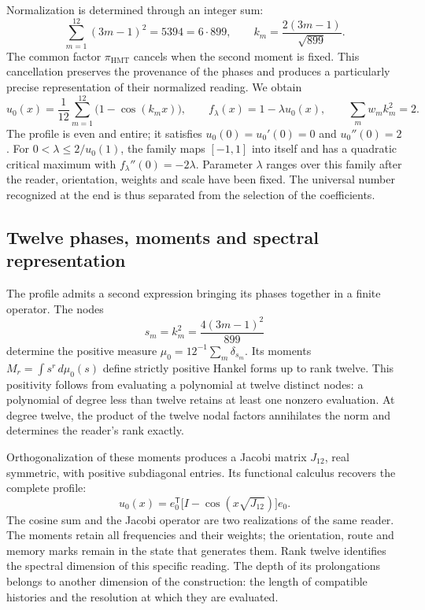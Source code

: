 Normalization is determined through an integer sum:
\[
\sum_{m=1}^{12}(3m-1)^2=5394=6\cdot899,
\qquad k_m=\frac{2(3m-1)}{\sqrt{899}}.
\]
The common factor \(\pi_{\mathrm{HMT}}\) cancels when the second moment is fixed.
This cancellation preserves the provenance of the phases and produces a
particularly precise representation of their normalized reading. We obtain
\[
u_0(x)=\frac1{12}\sum_{m=1}^{12}\bigl(1-\cos(k_mx)\bigr),
\qquad f_\lambda(x)=1-\lambda u_0(x),
\qquad \sum_mw_mk_m^2=2.
\]
The profile is even and entire; it satisfies \(u_0(0)=u_0'(0)=0\) and
\(u_0''(0)=2\). For \(0<\lambda\le2/u_0(1)\), the family maps
\([-1,1]\) into itself and has a quadratic critical maximum with
\(f_\lambda''(0)=-2\lambda\). Parameter \(\lambda\) ranges over this family
after the reader, orientation, weights and scale have been fixed. The universal
number recognized at the end is thus separated from the selection
of the coefficients.

\subsection{Twelve phases, moments and spectral representation}

The profile admits a second expression bringing its phases together in a finite
operator. The nodes
\[
s_m=k_m^2=\frac{4(3m-1)^2}{899}
\]
determine the positive measure \(\mu_0=12^{-1}\sum_m\delta_{s_m}\). Its
moments \(M_r=\int s^r\,d\mu_0(s)\) define strictly positive Hankel forms
up to rank twelve. This positivity follows from evaluating
a polynomial at twelve distinct nodes: a polynomial of degree less than
twelve retains at least one nonzero evaluation. At degree twelve, the product
of the twelve nodal factors annihilates the norm and determines the reader’s
rank exactly.

Orthogonalization of these moments produces a Jacobi matrix
\(J_{12}\), real symmetric, with positive subdiagonal entries. Its functional calculus
recovers the complete profile:
\[
u_0(x)=e_0^{\mathsf T}
\bigl[I-\cos(x\sqrt{J_{12}})\bigr]e_0.
\]
The cosine sum and the Jacobi operator are two realizations of the same
reader. The moments retain all frequencies and their weights; the
orientation, route and memory marks remain in the state that
generates them. Rank twelve identifies the spectral dimension of this
specific reading. The depth of its prolongations belongs to another dimension
of the construction: the length of compatible histories and the resolution
at which they are evaluated.

